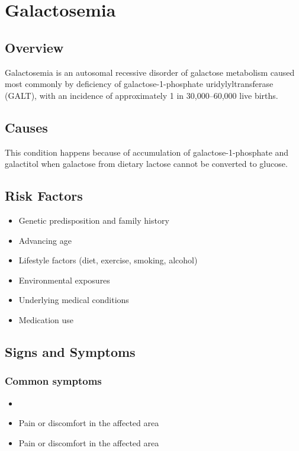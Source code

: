 \chapter{Galactosemia}
\label{sec:Galactosemia}

\section{Overview}
Galactosemia is an autosomal recessive disorder of galactose metabolism caused most commonly by deficiency of galactose-1-phosphate uridylyltransferase (GALT), with an incidence of approximately 1 in 30,000--60,000 live births.
\section{Causes}
This condition happens because of accumulation of galactose-1-phosphate and galactitol when galactose from dietary lactose cannot be converted to glucose.     
\section{Risk Factors}

\begin{itemize}[noitemsep]
  \item Genetic predisposition and family history
  \item Advancing age
  \item Lifestyle factors (diet, exercise, smoking, alcohol)
  \item Environmental exposures
  \item Underlying medical conditions
  \item Medication use
\end{itemize}
\section{Signs and Symptoms}

\subsection{Common symptoms}
\begin{itemize}[noitemsep]
  \item \item Pain or discomfort in the affected area    \item Pain or discomfort in the affected area
  \end{itemize}

